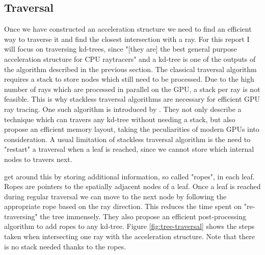 \documentclass{ACGSeminar}
\begin{document}
\subsection{Traversal}
Once we have constructed an acceleration structure we need to find an efficient way to traverse it and find the closest intersection with a ray. For this report I will focus on traversing kd-trees, since "[they are] the best general purpose acceleration structure for CPU raytracers" \cite{Foley:2005} and a kd-tree is one of the outputs of the algorithm described in the previous section.
The classical traversal algorithm requires a stack to store nodes which still need to be processed. Due to the high number of rays which are processed in parallel on the GPU, a stack per ray is not feasible. This is why stackless traversal algorithms are necessary for efficient GPU ray tracing. One such algorithm is introduced by \citet{popov2007stackless}. They not only describe a technique which can travers any kd-tree without needing a stack, but also propose an efficient memory layout, taking the peculiarities of modern GPUs into consideration. A usual limitation of stackless traversal algorithm is the need to "restart" a traversal when a leaf is reached, since we cannot store which internal nodes to travers next.

\citet{popov2007stackless} get around this by storing additional information, so called "ropes", in each leaf. Ropes are pointers to the spatially adjacent nodes of a leaf. Once a leaf is reached during regular traversal we can move to the next node by following the appropriate rope based on the ray direction. This reduces the time spent on "re-traversing" the tree immensely. They also propose an efficient post-processing algorithm to add ropes to any kd-tree. Figure \ref{fig:tree-traversal} shows the steps taken when intersecting one ray with the acceleration structure. Note that there is no stack needed thanks to the ropes.
\end{document}
